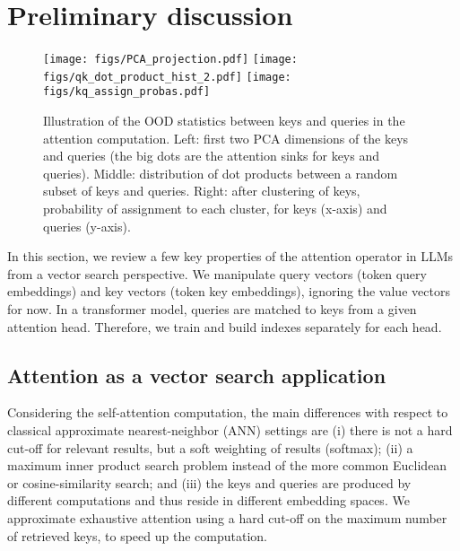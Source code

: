 
\section{Preliminary discussion}
\label{sec:motivation}


\begin{figure*}
   \vspace{-0.2em}
%
    \texttt{[image: figs/PCA\_projection.pdf]}
    \hfill
    \texttt{[image: figs/qk\_dot\_product\_hist\_2.pdf]}
    \hfill
    \texttt{[image: figs/kq\_assign\_probas.pdf]}
   \vspace{-0.8em}
    \caption{
    Illustration of the OOD statistics between keys and queries in the attention computation. 
    Left: first two PCA dimensions of the keys and queries (the big dots are the attention sinks for keys and queries). 
    Middle: distribution of dot products between a random subset of keys and queries.     
    Right: after clustering of keys, probability of assignment to each cluster, for  keys (x-axis) and queries (y-axis).
    \label{fig:ood}}
       \vspace{-0.8em}
\end{figure*}


In this section, we review a few key properties of the attention operator in LLMs from a vector search perspective. 
We manipulate query vectors (token query embeddings) and key vectors (token key embeddings), ignoring the value vectors for now. 
In a transformer model, queries are matched to keys from a given attention head.
Therefore, we train and build indexes separately for each head.
%
%
%
%

\subsection{Attention as a vector search application}

Considering the self-attention computation,
the main differences with respect to classical approximate nearest-neighbor (ANN) settings are 
(i) there is not a hard cut-off for relevant results, but a soft weighting of results (softmax); 
(ii) a maximum inner product search problem instead of the more common Euclidean or cosine-similarity search; and
(iii) the keys and queries are produced by different computations and thus reside in different embedding spaces.
%
We approximate exhaustive attention using a hard cut-off on the maximum number of retrieved keys, to speed up the computation. 

